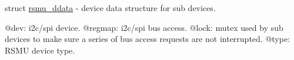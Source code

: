 struct \mbox{\hyperlink{structrsmu__ddata}{rsmu\+\_\+ddata}} -\/ device data structure for sub devices.

@dev\+: i2c/spi device. @regmap\+: i2c/spi bus access. @lock\+: mutex used by sub devices to make sure a series of bus access requests are not interrupted. @type\+: R\+S\+MU device type. 